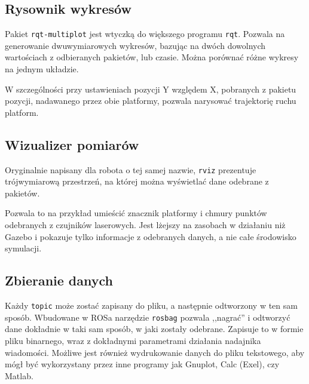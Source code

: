 	\subsection{Rysownik wykresów}
		Pakiet \texttt{rqt-multiplot} jest wtyczką do większego programu \texttt{rqt}.
		Pozwala na generowanie dwuwymiarowych wykresów, bazując na dwóch dowolnych wartościach z odbieranych pakietów, lub czasie.
		Można porównać różne wykresy na jednym układzie.
		
		W szczególności przy ustawieniach pozycji Y względem X, pobranych z pakietu pozycji, nadawanego przez obie platformy, pozwala narysować trajektorię ruchu platform.
	\subsection{Wizualizer pomiarów}
		Oryginalnie napisany dla robota o tej samej nazwie, \texttt{rviz} prezentuje trójwymiarową przestrzeń, na której można wyświetlać 
		dane odebrane z pakietów.
		
		Pozwala to na przykład umieścić znacznik platformy i chmury punktów odebranych z czujników laserowych.
		Jest lżejszy na zasobach w działaniu niż Gazebo i pokazuje tylko informacje z odebranych danych, a nie całe środowisko symulacji.
		
	\subsection{Zbieranie danych}
		Każdy \texttt{topic} może zostać zapisany do pliku, a następnie odtworzony w ten sam sposób.
		Wbudowane w ROSa narzędzie \texttt{rosbag} pozwala ,,nagrać'' i odtworzyć dane dokładnie w taki sam sposób, w jaki zostały odebrane.
		Zapisuje to w formie pliku binarnego, wraz z dokładnymi parametrami działania nadajnika wiadomości.
		Możliwe jest również wydrukowanie danych do pliku tekstowego, aby mógł być wykorzystany przez inne programy jak Gnuplot, Calc (Exel), czy Matlab.
		
	
	
	
	
	

